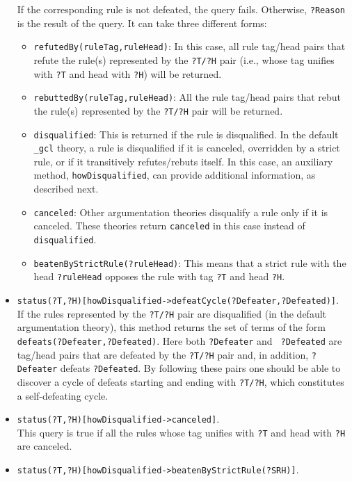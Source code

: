 \documentclass[11pt]{article}
\begin{document}
\begin{itemize}
  If the corresponding rule is not defeated, the query fails.  Otherwise,
  {\tt ?Reason} is the result of the query. It can take three different forms:
  \begin{itemize}
  \item {\tt refutedBy(ruleTag,ruleHead)}: In this case, all rule
    tag/head pairs that refute the rule(s) represented by the {\tt ?T/?H}
    pair (i.e., whose tag unifies with {\tt ?T} and head with {\tt ?H})
    will be returned.
  \item {\tt rebuttedBy(ruleTag,ruleHead)}: All the rule
    tag/head pairs that rebut the rule(s) represented by the {\tt ?T/?H} pair
    will be returned.
  \item {\tt disqualified}: This is returned if the rule is
    disqualified.
    In the default {\tt \_gcl} theory, a rule is
    disqualified if it is canceled, overridden by a strict rule,
    or if it transitively refutes/rebuts itself.
    In this case, an auxiliary method, {\tt howDisqualified}, can provide
    additional information, as described next. 
  \item {\tt canceled}: Other argumentation theories disqualify a rule only
    if it is canceled. These theories return \texttt{canceled} in this case
    instead of \texttt{disqualified}.
  \item \texttt{beatenByStrictRule(?ruleHead)}: This means that a strict
    rule with the head \texttt{?ruleHead} opposes the rule with tag
    \texttt{?T} and head \texttt{?H}.  
  \end{itemize}
\item  {\tt status(?T,?H)[howDisqualified->defeatCycle(?Defeater,?Defeated)]}.\\
  If the rules represented by the {\tt ?T/?H} pair are disqualified (in the
  default argumentation theory), this
  method returns the set of terms of the form {\tt
    defeats(?Defeater,?Defeated)}. Here both {\tt ?Defeater} and {\tt
    ?Defeated} are tag/head pairs that are defeated by the {\tt ?T/?H} pair
  and, in addition, {\tt ?Defeater} defeats {\tt ?Defeated}. By following
  these pairs one should be able
  to discover a cycle of defeats starting and ending
  with {\tt ?T/?H}, which constitutes a self-defeating cycle.
\item  {\tt status(?T,?H)[howDisqualified->canceled]}.\\
  This query is true if all the rules whose tag unifies with
  {\tt ?T} and head with {\tt ?H} are
  canceled.
\item  {\tt status(?T,?H)[howDisqualified->beatenByStrictRule(?SRH)]}.\\

\end{itemize}
\end{document}
